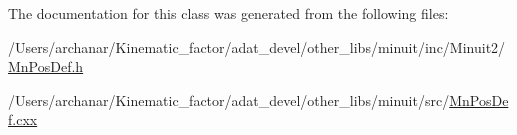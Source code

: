 The documentation for this class was generated from the following files\+:\begin{DoxyCompactItemize}
\item 
/\+Users/archanar/\+Kinematic\+\_\+factor/adat\+\_\+devel/other\+\_\+libs/minuit/inc/\+Minuit2/\mbox{\hyperlink{other__libs_2minuit_2inc_2Minuit2_2MnPosDef_8h}{Mn\+Pos\+Def.\+h}}\item 
/\+Users/archanar/\+Kinematic\+\_\+factor/adat\+\_\+devel/other\+\_\+libs/minuit/src/\mbox{\hyperlink{MnPosDef_8cxx}{Mn\+Pos\+Def.\+cxx}}\end{DoxyCompactItemize}
